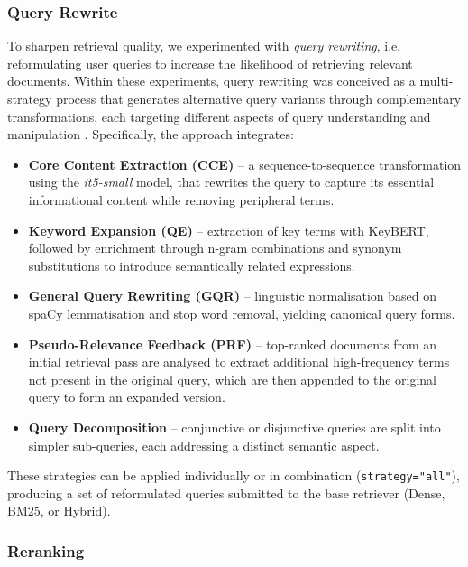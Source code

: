 \begin{spacing}{1.5}
\noindent \subsubsection*{\Large Query Rewrite}
To sharpen retrieval quality, we experimented with \textit{query rewriting}, i.e. reformulating user queries to increase the likelihood of retrieving relevant documents. Within these experiments, query rewriting was conceived as a multi-strategy process that generates alternative query variants through complementary transformations, each targeting different aspects of query understanding and manipulation \citep{li_dmqr-rag_2024}. Specifically, the approach integrates:
\begin{itemize}
      \item \textbf{Core Content Extraction (CCE)} -- a sequence-to-sequence transformation using the \textit{it5-small} model, that rewrites the query to capture its essential informational content while removing peripheral terms.
      \item \textbf{Keyword Expansion (QE)} -- extraction of key terms with KeyBERT, followed by enrichment through n-gram combinations and synonym substitutions to introduce semantically related expressions.
      \item \textbf{General Query Rewriting (GQR)} -- linguistic normalisation based on spaCy lemmatisation and stop word removal, yielding canonical query forms.
      \item \textbf{Pseudo-Relevance Feedback (PRF)} -- top-ranked documents from an initial retrieval pass are analysed to extract additional high-frequency terms not present in the original query, which are then appended to the original query to form an expanded version.
      \item \textbf{Query Decomposition} -- conjunctive or disjunctive queries are split into simpler sub-queries, each addressing a distinct semantic aspect.
\end{itemize}

These strategies can be applied individually or in combination (\texttt{strategy="all"}), producing a set of reformulated queries submitted to the base retriever (Dense, BM25, or Hybrid).\\


\noindent\subsubsection*{\Large Reranking}


\end{spacing}

